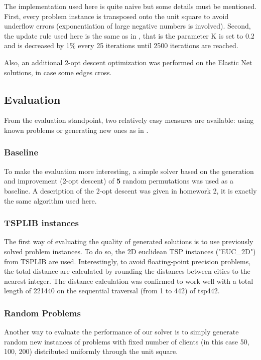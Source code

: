 \documentclass{article} %
\begin{document}
The implementation used here is quite naive but some details must be mentioned. First, every problem instance is transposed onto the unit square to avoid underflow errors (exponentiation of large negative numbers is involved). Second, the update rule used here is the same as in \citep{en_original}, that is the parameter K is set to 0.2 and is decreased by 1\% every 25 iterations until 2500 iterations are reached.

Also, an additional 2-opt descent optimization was performed on the Elastic Net solutions, in case some edges cross.


\subsection{Evaluation}

From the evaluation standpoint, two relatively easy measures are available: using known problems or generating new ones as in \citep{en_original}. 


\subsubsection{Baseline}
To make the evaluation more interesting, a simple solver based on the generation and improvement (2-opt descent) of \textbf{5} random permutations was used as a baseline. A description of the 2-opt descent was given in homework 2, it is exactly the same algorithm used here.


\subsubsection{TSPLIB instances}

The first way of evaluating the quality of generated solutions is to use previously solved problem instances. To do so, the 2D euclidean TSP instances ("EUC\_2D") from TSPLIB \citep{tsplib} are used. Interestingly, to avoid floating-point precision problems, the total distance are calculated by rounding the distances between cities to the nearest integer. The distance calculation was confirmed to work well with a total length of 221440 on the sequential traversal (from 1 to 442) of tsp442.


\subsubsection{Random Problems}
Another way to evaluate the performance of our solver is to simply generate random new instances of problems with fixed number of clients (in this case 50, 100, 200) distributed uniformly through the unit square.
\end{document}
